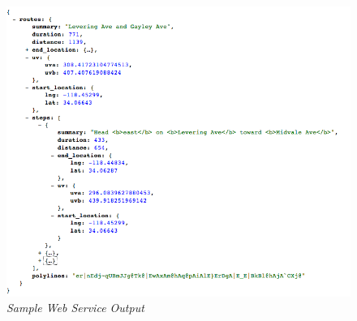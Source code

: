 \documentclass[12pt,fullpage,doublespace]{article}
\begin{document}
\begin{figure}[h]
\begin{center}
\includegraphics[scale=0.4]{webServiceOutput.png}
\caption{\small \sl Sample Web Service Output}
\label{fig:webServiceOutput}
\end{center}
\end{figure}
\clearpage

\newpage
\end{document}
